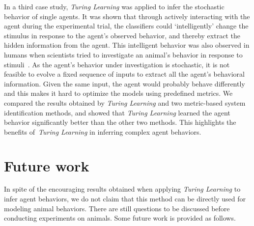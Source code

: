 In a third case study, \textit{Turing Learning} was applied to infer the stochastic behavior of single agents. It was shown that through actively interacting with the agent during the experimental trial, the classifiers could `intelligently' change the stimulus in response to the agent's observed behavior, and thereby extract the hidden information from the agent. This intelligent behavior was also observed in humans when scientists tried to investigate an animal's behavior in response to stimuli~\cite{Emily_2012}. As the agent's behavior under investigation is stochastic, it is not feasible to evolve a fixed sequence of inputs to extract all the agent's behavioral information. Given the same input, the agent would probably behave differently and this makes it hard to optimize the models using predefined metrics. We compared the results obtained by \textit{Turing Learning} and two metric-based system identification methods, and showed that \textit{Turing Learning} learned the agent behavior significantly better than the other two methods. This highlights the benefits of~\textit{Turing Learning} in inferring complex agent behaviors.

\section{Future work}

In spite of the encouraging results obtained when applying \textit{Turing Learning} to infer agent behaviors, we do not claim that this method can be directly used for modeling animal behaviors. There are still questions to be discussed before conducting experiments on animals. Some future work is provided as follows.

